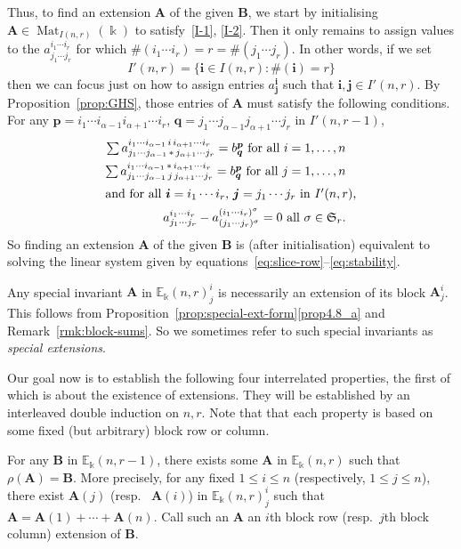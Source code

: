 \documentclass[10pt]{article}
\theoremstyle{definition}
\providecommand{\resp}{resp.\ }
\DeclareMathOperator{\Mat}{Mat}
\newcommand{\E}{\mathbb{E}}
\newcommand{\Sym}{\mathfrak{S}}
\newcommand{\bi}{{\boldsymbol{i}}} %
\newcommand{\bj}{{\boldsymbol{j}}}
\newcommand{\bp}{{\boldsymbol{p}}}
\newcommand{\bq}{{\boldsymbol{q}}}
\newcommand{\bA}{\mathbf{A}}
\newcommand{\bB}{\mathbf{B}}
\begin{document}
Thus, to find an extension $\bA$ of the given $\bB$, we start by
initialising $\bA \in \Mat_{I(n,r)}(\Bbbk)$ to satisfy~\eqref{I-1},
\eqref{I-2}. Then it only remains to assign values to the $a^{i_1 \cdots
 i_r}_{j_1 \cdots j_r}$ for which $\#(i_1 \cdots i_r) = r = \#(j_1
\cdots j_r)$. In other words, if we set
\[
I'(n,r) = \{\bi \in I(n,r): \#(\bi) = r\}
\]
then we can focus just on how to assign entries $a^\bi_\bj$ such that
$\bi,\bj \in I'(n,r)$. By Proposition~\ref{prop:GHS}, those entries of
$\bA$ must satisfy the following conditions. For any $\bp = i_1
\cdots i_{\alpha-1} i_{\alpha+1} \cdots i_r$, $\bq = j_1 \cdots
j_{\alpha-1} j_{\alpha+1} \cdots j_r$ in $I'(n,r-1)$,
\begin{align}
\textstyle \sum a^{i_1\cdots i_{\alpha-1} \, i
 \, i_{\alpha+1}\cdots i_r}_{j_1\cdots j_{\alpha-1} \,*\,
 j_{\alpha+1}\cdots j_r} = b^\bp_\bq \text{ for all } i = 1, \dots,
n\label{eq:slice-row} \\
\textstyle \sum a^{i_1\cdots i_{\alpha-1} \,*\, i_{\alpha+1}\cdots
 i_r}_{j_1\cdots j_{\alpha-1} \, j \, j_{\alpha+1}\cdots j_r} =
b^\bp_\bq \text{ for all } j = 1, \dots,
n \label{eq:slice-col}\\
\intertext{and for all $\bi = i_1 \cdots i_r$,
 $\bj = j_1 \cdots j_r$ in $I'(n,r)$,}
a^{i_1 \cdots i_r}_{j_1 \cdots j_r} - a^{(i_1 \cdots
 i_r)^\sigma}_{(j_1 \cdots j_r)^\sigma} = 0 \text{ all } \sigma \in
\Sym_r \label{eq:stability}.
\end{align}
So finding an extension $\bA$ of the given $\bB$ is (after
initialisation) equivalent to solving the linear system given by
equations~\eqref{eq:slice-row}--\eqref{eq:stability}.

Any special invariant $\bA$ in $\E_\Bbbk(n,r)^i_j$ is necessarily an
extension of its block $\bA^i_j$. This follows from Proposition~\ref{prop:special-ext-form}\ref{prop4.8_a} and Remark~\ref{rmk:block-sums}. So we
sometimes refer to such special invariants as \emph{special
 extensions}.

Our goal now is to establish the following four interrelated
properties, the first of which is about the existence of
extensions. They will be established by an interleaved double
induction on $n,r$. Note that that each property is based on some
fixed (but arbitrary) block row or column.


\begin{property}\label{1}
 For any $\bB$ in $\E_\Bbbk(n,r-1)$, there exists some $\bA$ in
 $\E_\Bbbk(n,r)$ such that $\rho(\bA) = \bB$. More precisely, for any
 fixed $1\le i \le n$ \textup{(}respectively, $1 \le j \le
 n$\textup{)}, there exist $\bA(j)$ \textup{(}\resp
 $\bA(i)$\textup{)} in $\E_\Bbbk(n,r)^i_j$ such that $\bA = \bA(1) +
 \cdots + \bA(n)$. Call such an $\bA$ an $i$th block row
 \textup{(}\resp $j$th block column\textup{)} extension of $\bB$.
\end{property}
\end{document}
